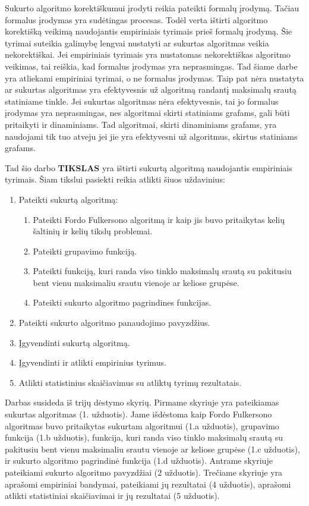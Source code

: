 Sukurto algoritmo korektiškumui įrodyti reikia pateikti formalų įrodymą. Tačiau formalus įrodymas yra sudėtingas procesas. Todėl verta ištirti algoritmo korektišką veikimą naudojantis empiriniais tyrimais prieš formalų įrodymą. Šie tyrimai suteikia galimybę lengvai nustatyti ar sukurtas algoritmas veikia nekorektiškai. Jei empiriniais tyrimais yra nustatomas nekorektiškas algoritmo veikimas, tai reiškia, kad formalus įrodymas yra neprasmingas. Tad šiame darbe yra atliekami empiriniai tyrimai, o ne formalus įrodymas. Taip pat nėra nustatyta ar sukurtas algoritmas yra efektyvesnis už algoritmą randantį maksimalų srautą statiniame tinkle. Jei sukurtas algoritmas nėra efektyvesnis, tai jo formalus įrodymas yra neprasmingas, nes algoritmai skirti statiniams grafams, gali būti pritaikyti ir dinaminiams. Tad algoritmai, skirti dinaminiams grafams, yra naudojami tik tuo atveju jei jie yra efektyvesni už algoritmus, skirtus statiniams grafams.

Tad šio darbo \textbf{TIKSLAS} yra ištirti sukurtą algoritmą naudojantis empiriniais tyrimais. Šiam tikslui pasiekti reikia atlikti šiuos uždavinius:
\begin{enumerate}
	\item Pateikti sukurtą algoritmą:	
	\begin{enumerate}
		\item  Pateikti Fordo Fulkersono algoritmą ir kaip jis buvo pritaikytas kelių šaltinių ir kelių tikslų problemai.
		\item Pateikti grupavimo funkciją.
		\item Pateikti funkciją, kuri randa viso tinklo maksimalų srautą su pakitusiu bent vienu maksimaliu srautu vienoje ar keliose grupėse.
		\item Pateikti sukurto algoritmo pagrindines funkcijas.
	\end{enumerate}
	\item Pateikti sukurto algoritmo panaudojimo pavyzdžius.
	\item Įgyvendinti sukurtą algoritmą.
	\item Įgyvendinti ir atlikti empirinius tyrimus.
	\item Atlikti statistinius skaičiavimus su atliktų tyrimų rezultatais.
\end{enumerate}

Darbas susideda iš trijų dėstymo skyrių. Pirmame skyriuje yra pateikiamas sukurtas algoritmas (1. užduotis). Jame išdėstoma kaip Fordo Fulkersono algoritmas buvo pritaikytas sukurtam algoritmui (1.a užduotis), grupavimo funkcija (1.b užduotis), funkcija, kuri randa viso tinklo maksimalų srautą su pakitusiu bent vienu maksimaliu srautu vienoje ar keliose grupėse (1.c užduotis), ir sukurto algoritmo pagrindinė funkcija (1.d užduotis). Antrame skyriuje pateikiami sukurto algoritmo pavyzdžiai (2 užduotis). Trečiame skyriuje yra aprašomi empiriniai bandymai, pateikiami jų rezultatai (4 užduotis), aprašomi atlikti statistiniai skaičiavimai ir jų rezultatai (5 užduotis).